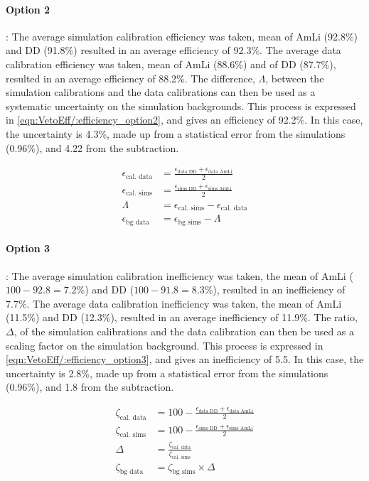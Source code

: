 \paragraph{Option 2}:
The average simulation calibration efficiency was taken, mean of AmLi (92.8\%) and DD (91.8\%) resulted in an average efficiency of 92.3\%.
The average data calibration efficiency was taken, mean of AmLi (88.6\%) and of DD (87.7\%), resulted in an average efficiency of 88.2\%.
The difference, $\Lambda$, between the simulation calibrations and the data calibrations can then be used as a systematic uncertainty on the simulation backgrounds.
This process is expressed in \autoref{eqn:VetoEff/:efficiency_option2}, and gives an efficiency of 92.2\%.
In this case, the uncertainty is 4.3\%, made up from a statistical error from the simulations (0.96\%), and 4.22 from the subtraction.

\begin{align}
	\epsilon_{\textrm{cal. data}} & = \frac{\epsilon_{\textrm{data DD}} + \epsilon_{\textrm{data AmLi}}}{2} \\
	\epsilon_{\textrm{cal. sims}} & = \frac{\epsilon_{\textrm{sims DD}} + \epsilon_{\textrm{sims AmLi}}}{2} \\
	\Lambda                       & = \epsilon_{\textrm{cal. sims}} - \epsilon_{\textrm{cal. data}}         \\
	\epsilon_{\textrm{bg data}}   & = \epsilon_{\textrm{bg sims}} - \Lambda
	\label{eqn:VetoEff/:efficiency_option2}
\end{align}

\paragraph{Option 3}:
The average simulation calibration inefficiency was taken, the mean of AmLi ($100 - 92.8 = 7.2$\%) and DD ($100 - 91.8 = 8.3$\%), resulted in an inefficiency of 7.7\%.
The average data calibration inefficiency was taken, the mean of AmLi (11.5\%) and DD (12.3\%), resulted in an average inefficiency of 11.9\%.
The ratio, $\Delta$, of the simulation calibrations and the data calibration can then be used as a scaling factor on the simulation background.
This process is expressed in \autoref{eqn:VetoEff/:efficiency_option3}, and gives an inefficiency of 5.5.
In this case, the uncertainty is 2.8\%, made up from a statistical error from the simulations (0.96\%), and 1.8 from the subtraction.

\begin{align}
	\zeta_{\textrm{cal. data}} & = 100 - \frac{\epsilon_{\textrm{data DD}} +\epsilon_{\textrm{data AmLi}}}{2}  \\
	\zeta_{\textrm{cal. sims}} & = 100 - \frac{\epsilon_{\textrm{sims DD}} + \epsilon_{\textrm{sims AmLi}}}{2} \\
	\Delta                     & = \frac{\zeta_{\textrm{cal. data}}}{\zeta_{\textrm{cal. sims}}}               \\
	\zeta_{\textrm{bg data}}   & = \zeta_{\textrm{bg sims}} \times \Delta
	\label{eqn:VetoEff/:efficiency_option3}
\end{align}

